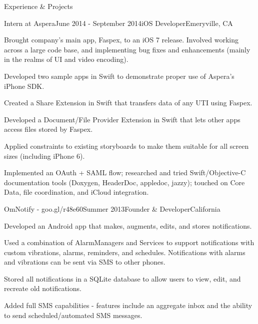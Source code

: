 \documentclass{resume} %
\begin{document}

\begin{rSection}{Experience \& Projects}

\begin{rSubsection}{Intern at Aspera}{June 2014 - September 2014}{iOS Developer}{Emeryville, CA}
\item Brought company's main app, Faspex, to an iOS 7 release. Involved working across
    a large code base, and implementing bug fixes and enhancements (mainly in the
    realms of UI and video encoding).
\item Developed two sample apps in Swift to demonstrate proper use of Aspera's iPhone
    SDK.
\item Created a Share Extension in Swift that transfers data of any UTI using Faspex.
\item Developed a Document/File Provider Extension in Swift that
    lets other apps access files stored by Faspex.
\item Applied constraints to existing storyboards to make them suitable for all
    screen sizes (including iPhone 6).
\item Implemented an OAuth + SAML flow; researched and tried Swift/Objective-C
    documentation tools (Doxygen, HeaderDoc, appledoc, jazzy); touched on Core Data, file
    coordination, and iCloud integration.
\end{rSubsection}


\begin{rSubsection}{OmNotify - goo.gl/r48e60}{Summer 2013}{Founder \& Developer}{California}
\item Developed an Android app that makes, augments, edits, and stores notifications.
\item Used a combination of AlarmManagers and Services to support notifications with
    custom vibrations, alarms, reminders, and schedules. Notifications with alarms and
    vibrations can be sent via SMS to other phones.
\item Stored all notifications in a SQLite database to allow users to view, edit, and recreate
    old notifications.
\item Added full SMS capabilities - features include an aggregate inbox and the ability
    to send scheduled/automated SMS messages.
\end{rSubsection}


\end{rSection}
\end{document}
